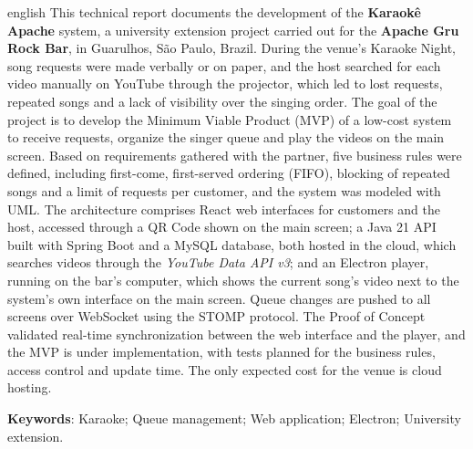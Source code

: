 \begin{resumo}[Abstract]
\begin{otherlanguage*}{english}
This technical report documents the development of the \textbf{Karaokê Apache} system, a university extension project carried out for the \textbf{Apache Gru Rock Bar}, in Guarulhos, São Paulo, Brazil. During the venue's Karaoke Night, song requests were made verbally or on paper, and the host searched for each video manually on YouTube through the projector, which led to lost requests, repeated songs and a lack of visibility over the singing order. The goal of the project is to develop the Minimum Viable Product (MVP) of a low-cost system to receive requests, organize the singer queue and play the videos on the main screen. Based on requirements gathered with the partner, five business rules were defined, including first-come, first-served ordering (FIFO), blocking of repeated songs and a limit of requests per customer, and the system was modeled with UML. The architecture comprises React web interfaces for customers and the host, accessed through a QR Code shown on the main screen; a Java 21 API built with Spring Boot and a MySQL database, both hosted in the cloud, which searches videos through the \textit{YouTube Data API v3}; and an Electron player, running on the bar's computer, which shows the current song's video next to the system's own interface on the main screen. Queue changes are pushed to all screens over WebSocket using the STOMP protocol. The Proof of Concept validated real-time synchronization between the web interface and the player, and the MVP is under implementation, with tests planned for the business rules, access control and update time. The only expected cost for the venue is cloud hosting.

\vspace{\onelineskip}
\noindent
\textbf{Keywords}: Karaoke; Queue management; Web application; Electron; University extension.
\end{otherlanguage*}
\end{resumo}
